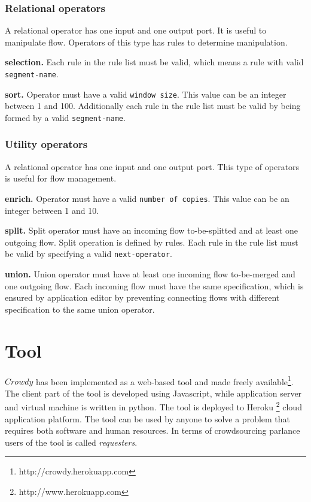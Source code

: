\subsection{Relational operators}
A relational operator has one input and one output port. It is useful to manipulate flow. 
Operators of this type has rules to determine manipulation.

\textbf{selection.}
Each rule in the rule list must be valid, which means a rule with valid \texttt{segment-name}.

\textbf{sort.}
Operator must have a valid \texttt{window size}. This value can be an integer between 
1 and 100. Additionally each rule in the rule list must be valid by being formed by a valid 
\texttt{segment-name}.

\subsection{Utility operators}
A relational operator has one input and one output port. This type of operators is useful for 
flow management.

\textbf{enrich.}
Operator must have a valid \texttt{number of copies}. This value can be an integer between 
1 and 10.

\textbf{split.}
Split operator must have an incoming flow to-be-splitted and at least one outgoing flow. 
Split operation is defined by rules. Each rule in the rule list must be valid by specifying 
a valid \texttt{next-operator}.

\textbf{union.}
Union operator must have at least one incoming flow to-be-merged and one outgoing flow. 
Each incoming flow must have the same specification, which is ensured by application editor 
by preventing connecting flows with different specification to the same union operator.



\chapter{Tool}
\label{sec:tool}
$Crowdy$ has been implemented as a web-based tool and made freely 
available\footnote{http://crowdy.herokuapp.com}. The 
client part of the tool is developed using Javascript, while application server and 
virtual machine is written in python. The tool is deployed to Heroku 
\footnote{http://www.herokuapp.com} cloud application 
platform. The tool can be used by anyone to solve a problem that requires both 
software and human resources. In terms of crowdsourcing parlance users of the tool 
is called \textit{requesters}.

